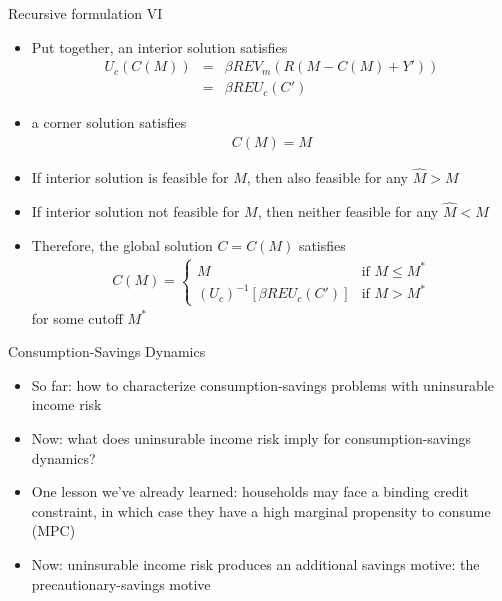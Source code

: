 \documentclass[9pt]{beamer}
\newcommand{\bit}{\begin{itemize}}
\newcommand{\eit}{\end{itemize}}
\newcommand{\ben}{\begin{enumerate}}
\newcommand{\een}{\end{enumerate}}
\newcommand{\bc}{\color{blue}}
\begin{document}
\begin{frame}{Recursive formulation VI}

\bit
\setlength\itemsep{1em}

\item Put together, an interior solution satisfies
\begin{eqnarray}
U_c(C(M)) &=&  \beta R  E V_m(R(M-C(M)+Y')) \nonumber \\
&=& \beta R  E U_c(C') \nonumber
\end{eqnarray}

\item a corner solution satisfies
\begin{eqnarray}
C(M)=M \nonumber
\end{eqnarray}

\item If interior solution is feasible for $M$, then also feasible for any $\hat M > M$

\item If interior solution not feasible for $M$, then neither feasible for any $\hat M<M$

\item Therefore, the global solution $C=C(M)$ satisfies
\begin{eqnarray}
C(M) = \left\{ \begin{array}{cc}
M & \text{if } M\leq M^* \\
(U_c)^{-1}\left[ \beta R  E U_c(C') \right] &\text{if } M> M^*
\end{array}\right. \nonumber
\end{eqnarray}
for some cutoff $M^*$

\eit

\end{frame}


\begin{frame}{Consumption-Savings Dynamics}

\bit
\setlength\itemsep{1em}

\item So far: how to characterize consumption-savings problems with uninsurable income risk

\item Now: what does uninsurable income risk imply for consumption-savings dynamics?

\item One lesson we've already learned: households may face a binding credit constraint, in which case they have a high {\bc marginal propensity to consume (MPC)}

\item Now: uninsurable income risk produces an additional savings motive: the {\bc precautionary-savings motive}
%	


\eit

\end{frame}
\end{document}
